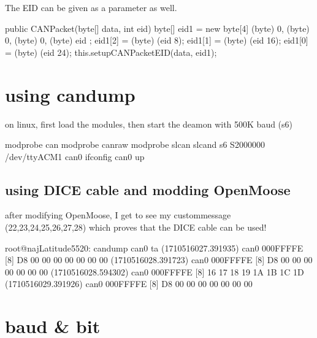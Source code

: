 \documentclass[letterpaper,10pt,english]{sphinxmanual}
\begin{document}
\sphinxAtStartPar
The EID can be given as a parameter as well.

\begin{sphinxVerbatim}[commandchars=\\\{\}]
public CANPacket(byte[] data, int eid)
\PYGZob{}
  byte[] eid1 = new byte[4]
  \PYGZob{}
    (byte) 0,
    (byte) 0,
    (byte) 0,
    (byte) eid
  \PYGZcb{};
  eid1[2] = (byte) (eid \PYGZgt{}\PYGZgt{} 8);
  eid1[1] = (byte) (eid \PYGZgt{}\PYGZgt{} 16);
  eid1[0] = (byte) (eid \PYGZgt{}\PYGZgt{} 24);
  this.setupCANPacketEID(data, eid1);
\PYGZcb{}
\end{sphinxVerbatim}


\chapter{using    candump}
\label{\detokenize{candump:using-candump}}\label{\detokenize{candump::doc}}
\sphinxAtStartPar
on linux, first load the modules, then start the deamon with 500K baud (\sphinxhyphen{}s6)

\begin{sphinxVerbatim}[commandchars=\\\{\}]
modprobe can
modprobe can\PYGZhy{}raw
modprobe slcan
slcand \PYGZhy{}s6 \PYGZhy{}S2000000 /dev/ttyACM1 can0
ifconfig can0 up
\end{sphinxVerbatim}


\section{using DICE cable and modding OpenMoose}
\label{\detokenize{candump:using-dice-cable-and-modding-openmoose}}
\sphinxAtStartPar
after modifying OpenMoose, I get to see my custom\sphinxhyphen{}message (22,23,24,25,26,27,28)
which proves that the DICE cable can be used!

\begin{sphinxVerbatim}[commandchars=\\\{\}]
root@naj\PYGZhy{}Latitude\PYGZhy{}5520:\PYGZti{}\PYGZsh{} candump can0 \PYGZhy{}ta
 (1710516027.391935)  can0  000FFFFE   [8]  D8 00 00 00 00 00 00 00
 (1710516028.391723)  can0  000FFFFE   [8]  D8 00 00 00 00 00 00 00
 (1710516028.594302)  can0  000FFFFE   [8]  16 17 18 19 1A 1B 1C 1D
 (1710516029.391926)  can0  000FFFFE   [8]  D8 00 00 00 00 00 00 00
\end{sphinxVerbatim}


\chapter{baud \& bit}
\label{\detokenize{apb:baud-bit}}\label{\detokenize{apb::doc}}
\noindent{}
\end{document}
